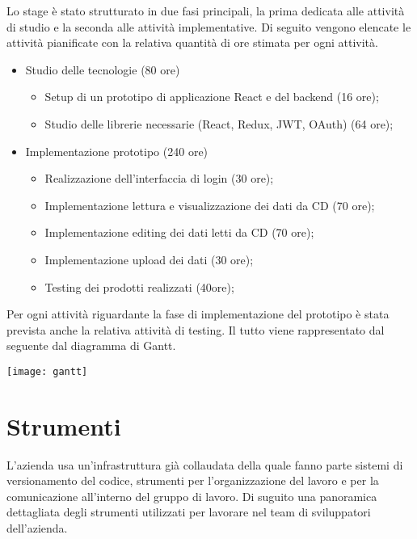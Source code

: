 Lo stage è stato strutturato in due fasi principali, la prima dedicata alle attività di studio e la seconda alle attività implementative. Di seguito vengono elencate le attività pianificate con la relativa quantità di ore stimata per ogni attività.

\begin{itemize}
  \item Studio delle tecnologie (80 ore)
        \begin{itemize}
          \item Setup di un prototipo di applicazione React e del backend (16 ore);
          \item Studio delle librerie necessarie (React, Redux, JWT, OAuth) (64 ore);
        \end{itemize}
  \item Implementazione prototipo (240 ore)
        \begin{itemize}
          \item Realizzazione dell’interfaccia di login (30 ore);
          \item Implementazione lettura e visualizzazione dei dati da CD (70 ore);
          \item Implementazione editing dei dati letti da CD (70 ore);
          \item Implementazione upload dei dati (30 ore);
          \item Testing dei prodotti realizzati (40ore);
        \end{itemize}
\end{itemize}

Per ogni attività riguardante la fase di implementazione del prototipo è stata prevista anche la relativa attività di testing.
Il tutto viene rappresentato dal seguente dal diagramma di Gantt.
\begin{center}
  \texttt{[image: gantt]}
\end{center}

\section{Strumenti}

L'azienda usa un'infrastruttura già collaudata della quale fanno parte sistemi di versionamento del codice, strumenti per l'organizzazione del lavoro e per la comunicazione all'interno del gruppo di lavoro.
Di suguito una panoramica dettagliata degli strumenti utilizzati per lavorare nel team di sviluppatori dell'azienda.

